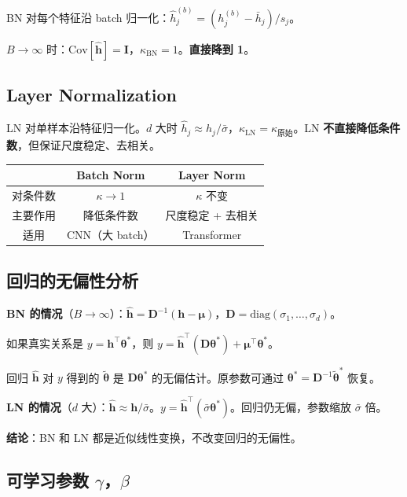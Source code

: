 \documentclass[12pt, a4paper]{ctexart}
\begin{document}
BN 对每个特征沿 batch 归一化：$\hat{h}_j^{(b)} = (h_j^{(b)} - \bar{h}_j)/s_j$。

$B\to\infty$ 时：$\text{Cov}[\hat{\mathbf{h}}] = \mathbf{I}$，$\kappa_{\text{BN}} = 1$。\textbf{直接降到 1}。

\subsection{Layer Normalization}

LN 对单样本沿特征归一化。$d$ 大时 $\hat{h}_j \approx h_j/\bar{\sigma}$，$\kappa_{\text{LN}} = \kappa_{\text{原始}}$。LN \textbf{不直接降低条件数}，但保证尺度稳定、去相关。

\begin{center}
\begin{tabular}{c|cc}
 & Batch Norm & Layer Norm \\
\hline
对条件数 & $\kappa \to 1$ & $\kappa$ 不变 \\
主要作用 & 降低条件数 & 尺度稳定 + 去相关 \\
适用 & CNN（大 batch）& Transformer \\
\end{tabular}
\end{center}

\subsection{回归的无偏性分析}

\textbf{BN 的情况}（$B \to \infty$）：$\hat{\mathbf{h}} = \mathbf{D}^{-1}(\mathbf{h} - \boldsymbol{\mu})$，$\mathbf{D} = \text{diag}(\sigma_1,\ldots,\sigma_d)$。

如果真实关系是 $y = \mathbf{h}^\top\boldsymbol{\theta}^*$，则 $y = \hat{\mathbf{h}}^\top(\mathbf{D}\boldsymbol{\theta}^*) + \boldsymbol{\mu}^\top\boldsymbol{\theta}^*$。

回归 $\hat{\mathbf{h}}$ 对 $y$ 得到的 $\tilde{\boldsymbol{\theta}}$ 是 $\mathbf{D}\boldsymbol{\theta}^*$ 的无偏估计。原参数可通过 $\boldsymbol{\theta}^* = \mathbf{D}^{-1}\tilde{\boldsymbol{\theta}}^*$ 恢复。

\textbf{LN 的情况}（$d$ 大）：$\hat{\mathbf{h}} \approx \mathbf{h}/\bar{\sigma}$。$y = \hat{\mathbf{h}}^\top(\bar{\sigma}\boldsymbol{\theta}^*)$。回归仍无偏，参数缩放 $\bar{\sigma}$ 倍。

\textbf{结论}：BN 和 LN 都是近似线性变换，不改变回归的无偏性。

\subsection{可学习参数 $\gamma$，$\beta$}
\end{document}

